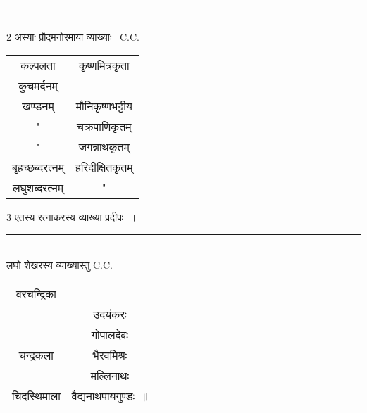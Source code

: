 \documentclass[11pt, openany]{book}
\makeatletter
\newcommand{\devanagarinumeral}[1]{
\devanagaridigits{\number \csname c@#1\endcsname}} %
\makeatother
\begin{document}
\begin{multicols}{2}
\noindent
\rule{1\linewidth}{0.5pt}\\

2 अस्याः प्रौदमनोरमाया व्याख्याः \textendash\ C.C.

\begin{tabular}{c c}
कल्पलता &कृष्णमित्रकृता \\
कुचमर्दनम् & \\
खण्डनम् &मौनिकृष्णभट्टीय \\
" & चक्रपाणिकृतम् \\
" & जगन्नाथकृतम् \\
बृहच्छब्दरत्नम्& हरिदीक्षितकृतम् \\
लघुशब्दरत्नम्& "\\
\end{tabular}

3 एतस्य रत्नाकरस्य व्याख्या प्रदीपः~॥ 

\noindent
\rule{1\linewidth}{0.5pt}\\

लघो शेखरस्य व्याख्यास्तु C.C. 

\begin{tabular}{c c}
वरचन्द्रिका & \\
& उदयंकरः \\
& गोपालदेवः \\
चन्द्रकला& भैरवमिश्रः \\
& मल्लिनाथः \\
चिदस्थिमाला & वैद्यनाथपायगुण्डः~॥
\end{tabular}
\end{multicols}

\fancyhead[RO,LE]{\thepage}
\cfoot{}
\newpage
\renewcommand{\thepage}{\devanagarinumeral{page}}
\setcounter{page}{23}

\end{document}
